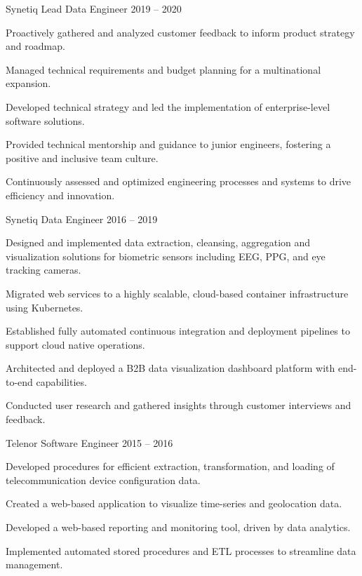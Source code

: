 \documentclass[]{awesome-cv}
\begin{document}
\begin{cventries}
	{Synetiq}
	{Lead Data Engineer}
	{2019 – 2020}
	{}
	{\begin{cvitems}
		\item {Proactively gathered and analyzed customer feedback to inform product strategy and roadmap.}
		\item {Managed technical requirements and budget planning for a multinational expansion.}
		\item {Developed technical strategy and led the implementation of enterprise-level software solutions.}
		\item {Provided technical mentorship and guidance to junior engineers, fostering a positive and inclusive team culture.}
		\item {Continuously assessed and optimized engineering processes and systems to drive efficiency and innovation.}
		\end{cvitems}}
	\cventry
	{Synetiq}
	{Data Engineer}
	{2016 – 2019}
	{}
	{\begin{cvitems}
		\item {Designed and implemented data extraction, cleansing, aggregation and visualization solutions for biometric sensors including EEG, PPG, and eye tracking cameras.}
		\item {Migrated web services to a highly scalable, cloud-based container infrastructure using Kubernetes.}
		\item {Established fully automated continuous integration and deployment pipelines to support cloud native operations.}
		\item {Architected and deployed a B2B data visualization dashboard platform with end-to-end capabilities.}
		\item {Conducted user research and gathered insights through customer interviews and feedback.}
		\end{cvitems}}
	\cventry
	{Telenor}
	{Software Engineer}
	{2015 – 2016}
	{}
	{\begin{cvitems}
		\item {Developed procedures for efficient extraction, transformation, and loading of telecommunication device configuration data.}
		\item {Created a web-based application to visualize time-series and geolocation data.}
		\item {Developed a web-based reporting and monitoring tool, driven by data analytics.}
		\item {Implemented automated stored procedures and ETL processes to streamline data management.}
		\end{cvitems}}
\end{cventries}
\end{document}
